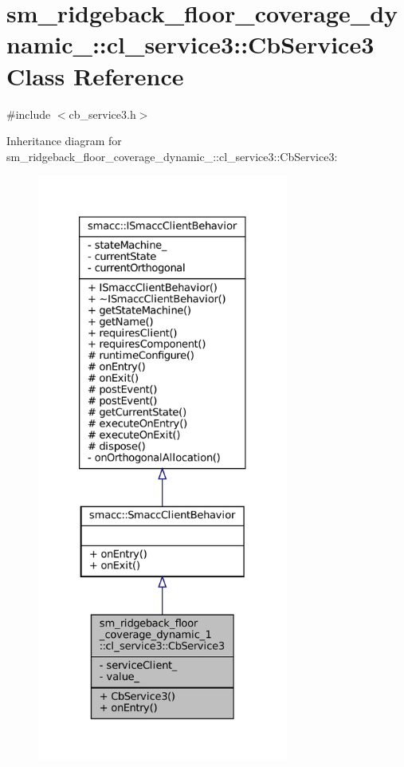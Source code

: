 \hypertarget{classsm__ridgeback__floor__coverage__dynamic__1_1_1cl__service3_1_1CbService3}{}\section{sm\+\_\+ridgeback\+\_\+floor\+\_\+coverage\+\_\+dynamic\+\_\+:\+:cl\+\_\+service3\+:\+:Cb\+Service3 Class Reference}
\label{classsm__ridgeback__floor__coverage__dynamic__1_1_1cl__service3_1_1CbService3}


{\ttfamily \#include $<$cb\+\_\+service3.\+h$>$}



Inheritance diagram for sm\+\_\+ridgeback\+\_\+floor\+\_\+coverage\+\_\+dynamic\+\_\+:\+:cl\+\_\+service3\+:\+:Cb\+Service3\+:
\nopagebreak
\begin{figure}[H]
\begin{center}
\leavevmode
\includegraphics[height=550pt]{classsm__ridgeback__floor__coverage__dynamic__1_1_1cl__service3_1_1CbService3__inherit__graph}
\end{center}
\end{figure}



